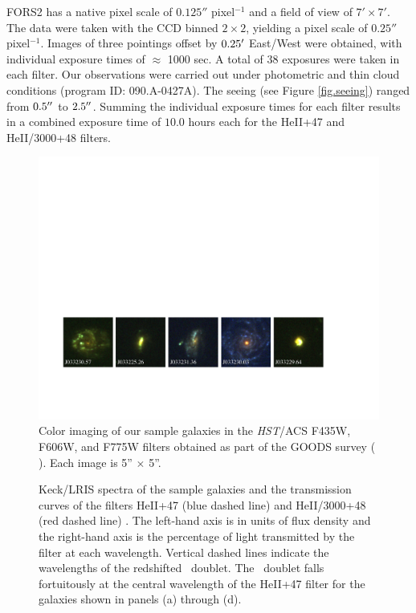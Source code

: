 \documentclass[twocolumn]{aastex61}
\begin{document}
FORS2 has a native pixel scale of $0.125''$ pixel$^{-1}$ and a field of view of $7'\times7'$.  The data were taken with 
the CCD binned $2\times2$, yielding a pixel scale of $0.25''$ pixel$^{-1}$.
Images of three pointings offset by $0.25\mbox{$^\prime$}$ East/West were obtained, with individual exposure times of $\approx$ 1000 sec.  A total of 38  exposures were taken in each filter. 
Our observations were carried out under photometric and thin cloud conditions (program ID: 090.A-0427A). The seeing (see Figure \ref{fig.seeing}) ranged from $0.5\mbox{$^{\prime\prime}$}$ to $2.5\mbox{$^{\prime\prime}$}$. Summing the individual exposure times for each filter results in a combined exposure time of $10.0$ hours each for the HeII+47 and HeII/3000+48 filters.

\begin{figure}[!ht]
\centering
\includegraphics[scale=.73]{../Figures/fors2_color_imstamps.pdf}
\caption{Color imaging of our sample galaxies in the \emph{HST}/ACS F435W, F606W, and F775W filters obtained as part of the GOODS survey (\citeauthor{Giavalisco2004} \citeyear{Giavalisco2004}). Each image is 5'' $\times$ 5''.\label{fig:hstims}}
\end{figure}

\begin{figure}[!h]
\centering
{}
\caption{Keck/LRIS spectra of the sample galaxies and the transmission curves of the filters HeII+47 (blue dashed line) and HeII/3000+48 (red dashed line) . The left-hand axis is in units of flux density and the right-hand axis is the percentage of light transmitted by the filter at each wavelength. Vertical dashed lines indicate the wavelengths of the redshifted \ doublet. The \ doublet falls fortuitously at the central wavelength of the HeII+47 filter for the galaxies shown in panels (a) through (d).}
\label{fig:spec_images}
\end{figure}
\end{document}
